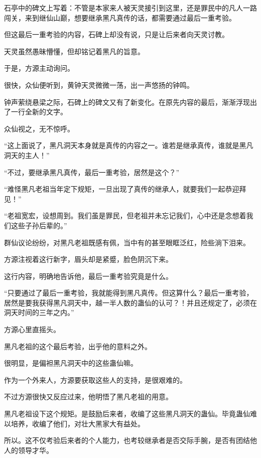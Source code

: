 
\begin{this_body}



石亭中的碑文上写着：不管是本家来人被天灵接引到这里，还是罪民中的凡人一路闯关，来到继仙山巅，想要继承黑凡真传的话，都需要通过最后一重考验。

但这最后一重考验的内容，石碑上却没有说，只是让后来者向天灵讨教。

天灵虽然愚昧懵懂，但却铭记着黑凡的旨意。

于是，方源主动询问。

很快，众仙便听到，黄钟天灵微微一荡，出一声悠扬的钟鸣。

钟声萦绕悬梁之际，石碑上的碑文又有了新变化。在原先内容的最后，渐渐浮现出了一行全新的文字。

众仙视之，无不惊呼。

“这上面说了，黑凡洞天本身就是真传的内容之一。谁若是继承真传，谁就是黑凡洞天的主人！”

“不过，要继承黑凡真传，最后一重考验，居然是这个？”

“难怪黑凡老祖当年定下规矩，一旦出现了真传的继承人，就要我们一起恭迎拜见！”

“老祖宽宏，设想周到。我们虽是罪民，但老祖并未忘记我们，心中还是念想着我们这些子孙后辈的。”

群仙议论纷纷，对黑凡老祖既感有佩，当中有的甚至眼眶泛红，险些淌下泪来。

方源注视着这行新字，眉头却是紧蹙，脸色阴沉下来。

这行内容，明确地告诉他，最后一重考验究竟是什么。

“只要通过了最后一重考验，我就能得到黑凡真传。但这算什么？最后一重考验，居然是要我获得黑凡洞天中，越一半人数的蛊仙的认可？！并且还规定了，必须在洞天时间的三年之内。”

方源心里直摇头。

黑凡老祖的这个最后考验，出乎他的意料之外。

很明显，是偏袒黑凡洞天中的这些蛊仙嘛。

作为一个外来人，方源要获取这些人的支持，是很艰难的。

不过方源很快又反应过来，他明悟了黑凡老祖的用意。

黑凡老祖设下这个规矩。是鼓励后来者，收编了这些黑凡洞天的蛊仙。毕竟蛊仙难以培养，收编了他们，对壮大黑家大有益处。

所以。这不仅考验后来者的个人能力，也考较继承者是否交际手腕，是否有团结他人的领导才华。


\end{this_body}
